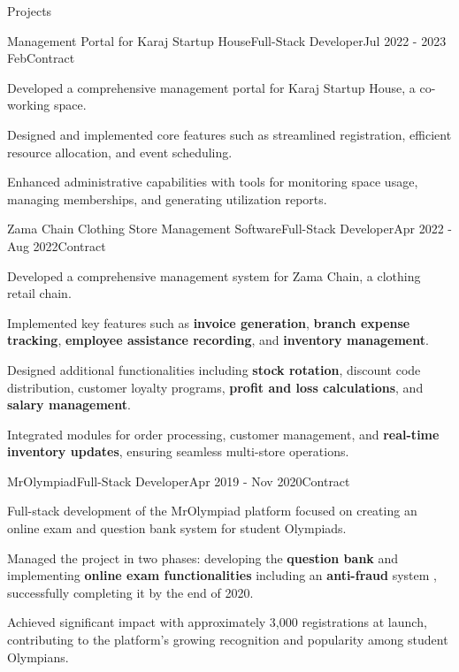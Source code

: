 \documentclass[]{kyvernitis-resume}
\begin{document}
\begin{section}{Projects}


\begin{subsection}{Management Portal for Karaj Startup House}{Full-Stack Developer}{Jul 2022 - 2023 Feb}{Contract}{}
		\item Developed a comprehensive management portal for Karaj Startup House, a co-working space.
		\item Designed and implemented core features such as streamlined registration, efficient resource allocation, and event scheduling.
		\item Enhanced administrative capabilities with tools for monitoring space usage, managing memberships, and generating utilization reports.
\end{subsection}


    \begin{subsection}{Zama Chain Clothing Store Management Software}{Full-Stack Developer}{Apr 2022 - Aug 2022}{Contract}{}
		\item Developed a comprehensive management system for Zama Chain, a clothing retail chain. %
		\item Implemented key features such as \textbf{invoice generation}, \textbf{branch expense tracking}, \textbf{employee assistance recording}, and \textbf{inventory management}.
		\item Designed additional functionalities including \textbf{stock rotation}, discount code distribution, customer loyalty programs, \textbf{profit and loss calculations}, and \textbf{salary management}.
		\item Integrated modules for order processing, customer management, and \textbf{real-time inventory updates}, ensuring seamless multi-store operations.

    \end{subsection}


    \begin{subsection}{MrOlympiad}{Full-Stack Developer}{Apr 2019 - Nov 2020}{Contract}{}
		\item Full-stack development of the MrOlympiad platform  focused on creating an online exam and question bank system for student Olympiads.

		\item Managed the project in two phases: developing the \textbf{question bank} and implementing \textbf{online exam functionalities} including an \textbf{anti-fraud} system , successfully completing it by the end of 2020.
		\item Achieved significant impact with approximately 3,000 registrations at launch, contributing to the platform’s growing recognition and popularity among student Olympians.

    \end{subsection}
    
\end{section}
\end{document}
